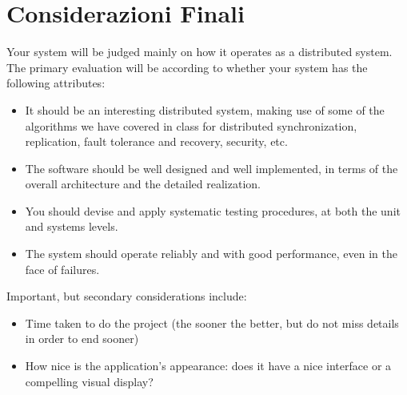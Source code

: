 
\chapter{Considerazioni Finali}

Your system will be judged mainly on how it operates as a distributed system. The primary evaluation will be according to whether your system has the following attributes:

\begin{itemize}
	\item It should be an interesting distributed system, making use of some of	the algorithms we have covered in class for distributed synchronization, replication, fault tolerance and recovery, security, etc.
	\item The software should be well designed and well implemented, in terms of the overall architecture and the detailed realization. 
	\item You should devise and apply systematic testing procedures, at both the unit and systems levels.
	\item The system should operate reliably and with good performance, even in the face of failures.
\end{itemize}

Important, but secondary considerations include:

\begin{itemize}
	\item Time taken to do the project (the sooner the better, but do not miss details in order to end sooner)
	\item How nice is the application's appearance: does it have a nice interface or a compelling visual display?
\end{itemize}

